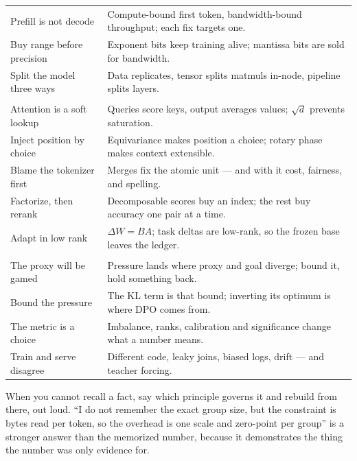 {\begin{tabularx}{\textwidth}{@{}p{} X@{}}
Prefill is not decode & Compute-bound first token, bandwidth-bound throughput; each fix targets one. \\
Buy range before precision & Exponent bits keep training alive; mantissa bits are sold for bandwidth. \\
Split the model three ways & Data replicates, tensor splits matmuls in-node, pipeline splits layers. \\
\addlinespace
\multicolumn{2}{@{}l}{\textit{E --- Architecture and adaptation}} \\
Attention is a soft lookup & Queries score keys, output averages values; $\sqrt{d}$ prevents saturation. \\
Inject position by choice & Equivariance makes position a choice; rotary phase makes context extensible. \\
Blame the tokenizer first & Merges fix the atomic unit --- and with it cost, fairness, and spelling. \\
Factorize, then rerank & Decomposable scores buy an index; the rest buy accuracy one pair at a time. \\
Adapt in low rank & $\Delta W = BA$; task deltas are low-rank, so the frozen base leaves the ledger. \\
\addlinespace
\multicolumn{2}{@{}l}{\textit{F --- Proxies}} \\
The proxy will be gamed & Pressure lands where proxy and goal diverge; bound it, hold something back. \\
Bound the pressure & The KL term is that bound; inverting its optimum is where DPO comes from. \\
The metric is a choice & Imbalance, ranks, calibration and significance change what a number means. \\
Train and serve disagree & Different code, leaky joins, biased logs, drift --- and teacher forcing. \\
\bottomrule
\end{tabularx}
}

\begin{keyinsight}
When you cannot recall a fact, say which principle governs it and rebuild from there, out loud. ``I do not remember the exact group size, but the constraint is bytes read per token, so the overhead is one scale and zero-point per group'' is a stronger answer than the memorized number, because it demonstrates the thing the number was only evidence for.
\end{keyinsight}
